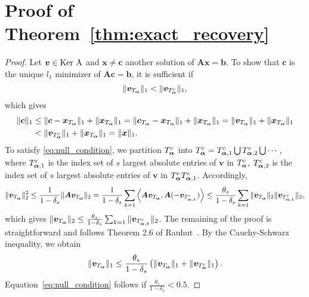 \section{Proof of Theorem~\ref{thm:exact_recovery}} \label{app:exact_recovery}

\begin{proof}
  Let $\bm v \in \rm{Ker}~\bm A$ and $\bm x \neq \bm c$ another solution of $\bm A \bm x = \bm b$. 
  To show that $\bm c$ is the unique $l_1$ minimizer of $\bm A \bm c  = \bm b$, it is sufficient if 
  \begin{equation}
    \Vert \bm v_{T_{\bm\alpha}}\Vert_1 < \Vert \bm v_{T_{\bm\alpha}^c}\Vert_1,
    \label{eq:null_condition}
  \end{equation}
  which gives
  \begin{equation}
    \begin{split}
      \Vert \bm c \Vert_1 &\le \Vert \bm c - \bm x_{T_{\bm\alpha}}\Vert_1 + \Vert  \bm x_{T_{\bm\alpha}}\Vert_1
      = \Vert \bm c_{T_{\bm\alpha}} - \bm x_{T_{\bm\alpha}}\Vert_1 + \Vert  \bm x_{T_{\bm\alpha}}\Vert_1
      = \Vert \bm v_{T_{\bm\alpha}}\Vert_1 + \Vert  \bm x_{T_{\bm\alpha}}\Vert_1  \\
      &< \Vert \bm v_{T_{\bm\alpha}^c}\Vert_1 + \Vert  \bm x_{T_{\bm\alpha}}\Vert_1 = \Vert \bm x \Vert_1.
    \end{split} 
  \end{equation}
  To satisfy \eqref{eq:null_condition}, we partition $T_{\bm\alpha}^c$ into $T_{\bm\alpha}^c =  T_{\bm\alpha,1}^c \bigcup  T_{\bm\alpha,2}^c \bigcup \cdots$, where $T_{\bm\alpha,1}^c$ is the index set of $s$ largest absolute entries of $\bm v$ in $T_{\bm\alpha}^c$, $T_{\bm\alpha,2 }^c$ is the index set of $s$ largest absolute entries of $\bm v$ in $T_{\bm\alpha}^c T_{\bm\alpha,1}^c$.
  Accordingly, 
  \begin{equation}
    \Vert \bm v_{T_{\bm\alpha}}\Vert_2^2 \le \frac{1}{1-\delta_s} \Vert \bm A \bm v_{T_{\bm\alpha}}\Vert_2 
    = \frac{1}{1-\delta_s} \sum_{k=1} \left\langle \bm A \bm v_{T_{\bm\alpha}}, \bm A (-\bm v_{T_{\bm\alpha,k}^c}) \right\rangle \le \frac{\theta_s}{1-\delta_s} \sum_{k=1} \Vert \bm v_{T_{\bm\alpha}}\Vert_2 \Vert \bm v_{T_{\bm\alpha,k}^c}\Vert_2,
  \end{equation}
  which gives $\Vert \bm v_{T_{\bm\alpha}}\Vert_2 \le \frac{\theta_s}{1-\delta_s} \sum_{k=1}  \Vert \bm v_{T_{\bm\alpha,k}^c}\Vert_2$.
  The remaining of the proof is straightforward and follows {\rm Theorem 2.6} of Rauhut~\cite{Rauhut_2010CsSM}.
  By the Cauchy-Schwarz inequality, we obtain 
  \begin{equation}
    \Vert \bm v_{T_{\bm\alpha}}\Vert_1 \le  \frac{\theta_s}{1-\delta_s} \left( \Vert \bm v_{T_{\bm\alpha}}\Vert_1 + \Vert \bm v_{T_{\bm\alpha}^c}\Vert_1 \right).
  \end{equation}
  Equation~\eqref{eq:null_condition} follows if $\frac{\theta_s}{1-\delta_s} < 0.5$. 
\end{proof}

